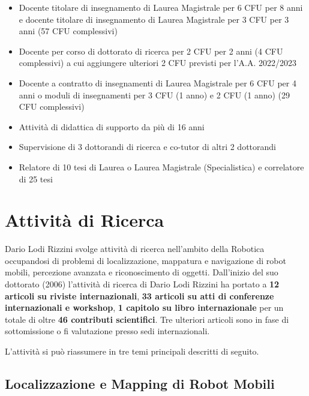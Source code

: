 \documentclass[11pt]{article}
\begin{document}
\begin{itemize}
\begin{itemize}
\item Docente titolare di insegnamento di Laurea Magistrale per 6 CFU per 8 anni e docente titolare di insegnamento di Laurea Magistrale per 3 CFU per 3 anni (57 CFU complessivi)
\item Docente per corso di dottorato di ricerca per 2 CFU per 2 anni (4 CFU complessivi) a cui aggiungere ulteriori 2 CFU previsti per l'A.A. 2022/2023
\item Docente a contratto di insegnamenti di Laurea Magistrale per 6 CFU per 4 anni o moduli di insegnamenti per 3 CFU (1 anno) e 2 CFU (1 anno) (29 CFU complessivi) 
\item Attivit\`a di didattica di supporto da pi\`u di 16 anni
\item Supervisione di 3 dottorandi di ricerca e co-tutor di altri 2 dottorandi
\item Relatore di 10 tesi di Laurea o Laurea Magistrale (Specialistica) e correlatore di 25 tesi
\end{itemize}



\section{Attivit\`a di Ricerca}

Dario Lodi Rizzini svolge attivit\`a di ricerca nell'ambito della Robotica occupandosi di problemi di localizzazione, mappatura e navigazione di robot mobili, percezione avanzata e riconoscimento di oggetti.
Dall'inizio del suo dottorato (2006) l'attivit\`a di ricerca di Dario Lodi Rizzini ha portato a 
\textbf{12 articoli su riviste internazionali}, 
\textbf{33 articoli su atti di conferenze internazionali e workshop},
\textbf{1 capitolo su libro internazionale} 
per un totale di oltre \textbf{46 contributi scientifici}.
Tre ulteriori articoli sono in fase di sottomissione o fi valutazione presso sedi internazionali.
 
L'attivit\`a si pu\`o riassumere in tre temi principali descritti di seguito.  

\subsection*{Localizzazione e Mapping di Robot Mobili}


\end{itemize}
\end{document}
